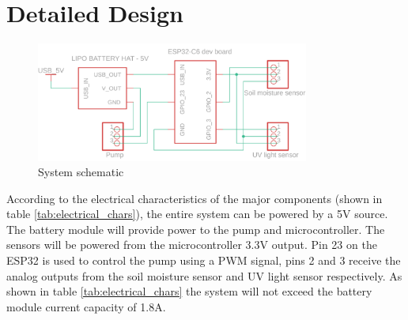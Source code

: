\graphicspath{{detail_design/fig/}}

\chapter{Detailed Design}
\label{chap:detail_design}

\begin{figure}[!h]
    \centering
    \includegraphics[width= 0.8\textwidth]{Report/detail_design/fig/detail_schematic.png}
    \caption{System schematic}
    \label{fig:detail_schematic}
\end{figure}

According to the electrical characteristics of the major components (shown in table \ref{tab:electrical_chars}), the entire system can be powered by a 5V source. The battery module will provide power to the pump and microcontroller. The sensors will be powered from the microcontroller 3.3V output. Pin 23 on the ESP32 is used to control the pump using a \ac{PWM} signal, pins 2 and 3 receive the analog outputs from the soil moisture sensor and \ac{UV} light sensor respectively. As shown in table \ref{tab:electrical_chars} the system will not exceed the battery module current capacity of 1.8A.

